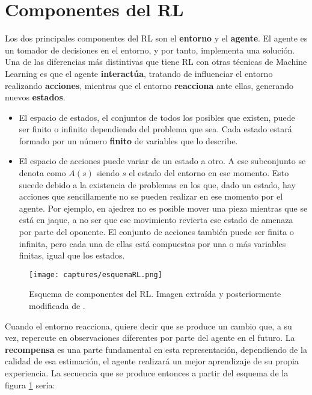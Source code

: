 \documentclass[11pt,fleqn]{book} %
\begin{document}
\section{Componentes del RL}\label{sec:componentesRL}

Los dos principales componentes del RL son el \textbf{entorno} y el \textbf{agente}. El agente es un tomador de decisiones en el entorno, y por tanto, implementa una solución. Una de las diferencias más distintivas que tiene RL con otras técnicas de Machine Learning es que el agente \textbf{interactúa}, tratando de influenciar el entorno realizando \textbf{acciones}, mientras que el entorno \textbf{reacciona} ante ellas, generando nuevos \textbf{estados}. \\

\begin{itemize}
	\item El espacio de estados, el conjuntos de todos los posibles que existen, puede ser finito o infinito dependiendo del problema que sea. Cada estado estará formado por un número \textbf{finito} de variables que lo describe. \\
	
	\item El espacio de acciones puede variar de un estado a otro. A ese subconjunto se denota como $A(s)$ siendo $s$ el estado del entorno en ese momento. Esto sucede debido a la existencia de problemas en los que, dado un estado, hay acciones que sencillamente no se pueden realizar en ese momento por el agente. Por ejemplo, en ajedrez no es posible mover una pieza mientras que se está en jaque, a no ser que ese movimiento revierta ese estado de amenaza por parte del oponente. El conjunto de acciones también puede ser finita o infinita, pero cada una de ellas está compuestas por una o más variables finitas, igual que los estados.
\end{itemize}

\begin{figure}[H]
	\centering\texttt{[image: captures/esquemaRL.png]}
	\caption{Esquema de componentes del RL. Imagen extraída y posteriormente modificada de \cite{article:RLwikipedia}.}
	\label{fig:esquemaRL} %
\end{figure}

Cuando el entorno reacciona, quiere decir que se produce un cambio que, a su vez, repercute en observaciones diferentes por parte del agente en el futuro. La \textbf{recompensa} es una parte fundamental en esta representación, dependiendo de la calidad de esa estimación, el agente realizará un mejor aprendizaje de su propia experiencia. La secuencia que se produce entonces a partir del esquema de la figura \ref{fig:esquemaRL} sería:
\end{document}
